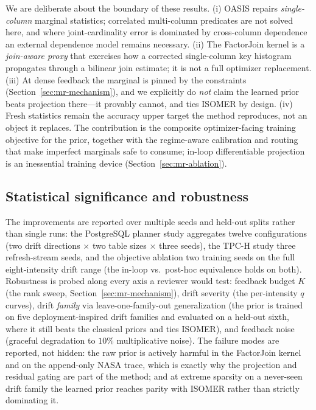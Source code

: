 We are deliberate about the boundary of these results. (i) OASIS repairs
\emph{single-column} marginal statistics; correlated multi-column predicates are
not solved here, and where joint-cardinality error is dominated by cross-column
dependence an external dependence model remains necessary. (ii) The FactorJoin
kernel is a \emph{join-aware proxy} that exercises how a corrected single-column
key histogram propagates through a bilinear join estimate; it is not a full
optimizer replacement. (iii) At dense feedback the marginal is pinned by the
constraints (Section~\ref{sec:mr-mechanism}), and we explicitly do \emph{not}
claim the learned prior beats projection there---it provably cannot, and ties
ISOMER by design. (iv) Fresh statistics remain the accuracy upper target the
method reproduces, not an object it replaces. The contribution is the
composite optimizer-facing training objective for the prior, together with the
regime-aware calibration and routing that make imperfect marginals safe to
consume; in-loop differentiable projection is an inessential training device
(Section~\ref{sec:mr-ablation}).

\subsection{Statistical significance and robustness}
\label{sec:mr-significance}

The improvements are reported over multiple seeds and held-out splits rather than
single runs: the PostgreSQL planner study aggregates twelve configurations
(two drift directions $\times$ two table sizes $\times$ three seeds), the TPC-H
study three refresh-stream seeds, and the objective ablation two training seeds
on the full eight-intensity drift range (the in-loop vs.\ post-hoc equivalence
holds on both). Robustness is probed along every axis a reviewer would test:
feedback budget $K$ (the rank sweep, Section~\ref{sec:mr-mechanism}), drift
severity (the per-intensity $q$ curves), drift \emph{family} via
leave-one-family-out generalization (the prior is trained on five
deployment-inspired drift families and evaluated on a held-out sixth, where it
still beats the classical priors and ties ISOMER), and feedback noise (graceful
degradation to $10\%$ multiplicative noise). The failure modes are reported, not
hidden: the raw prior is actively harmful in the FactorJoin kernel and on the
append-only NASA trace, which is exactly why the projection and residual gating
are part of the method; and at extreme sparsity on a never-seen drift family the
learned prior reaches parity with ISOMER rather than strictly dominating it.
